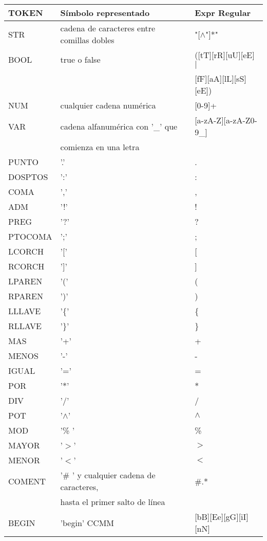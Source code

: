 \begin{table}[!htb]
\begin{center}
\begin{tabular}{| l | l | l |}
\hline
{\bf TOKEN} & {\bf Símbolo representado} & {\bf Expr Regular}\\
\hline
\hline
STR 	& cadena de caracteres entre comillas dobles & "[$\wedge$"]*" \\
\hline
BOOL & true o false & ([tT][rR][uU][eE] $\mid$ \\

	& 				& [fF][aA][lL][sS][eE]) \\
\hline
NUM 	& cualquier cadena numérica & [0-9]+ \\
\hline
VAR 	& cadena alfanumérica con '_' que  & [a-zA-Z][a-zA-Z0-9_] \\
	& comienza en una letra				&	\\
\hline
PUNTO & '.' & . \\
\hline
DOSPTOS	& ':' & : \\
\hline
COMA & ',' & , \\
\hline
ADM & '!' & ! \\
\hline
PREG & '?' & ? \\
\hline
PTOCOMA 	& ';' & ; \\
\hline
LCORCH & '[' & [ \\
\hline
RCORCH & ']' & ] \\
\hline
LPAREN & '(' & ( \\
\hline
RPAREN & ')' & ) \\
\hline
LLLAVE & '\{' & \{ \\
\hline
RLLAVE& '\}' & \} \\
\hline
MAS & '+' & + \\
\hline
MENOS & '-' & - \\
\hline
IGUAL & '=' & = \\
\hline
POR & '*' & * \\
\hline
DIV & '/' & / \\
\hline
POT & '$\wedge$' & $\wedge$  \\
\hline
MOD & '\% ' & \% \\
\hline
MAYOR & '$>$' & $>$ \\
\hline
MENOR & '$<$' & $<$ \\
\hline
COMENT &'\# ' y cualquier cadena de caracteres, & \#.* \\
		&  hasta el primer salto de línea		&	\\
\hline
BEGIN & 'begin' CCMM &  [bB][Ee][gG][iI][nN]\\

\end{tabular}
\end{center}
\end{table}
